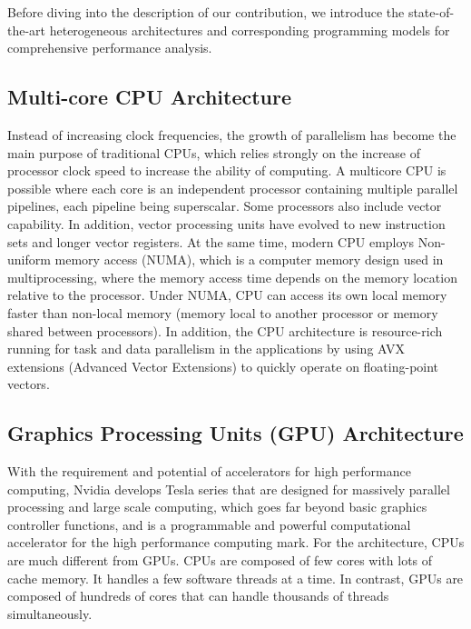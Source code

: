 
Before diving into the description of our contribution, we introduce the state-of-the-art heterogeneous architectures and corresponding programming models for comprehensive performance analysis.

\subsection{Multi-core CPU Architecture}
  Instead of increasing clock frequencies, the growth of parallelism has become the main purpose of traditional CPUs, which relies strongly on the increase of processor clock speed to increase the ability of computing. A multicore CPU is possible where each core is an independent processor containing multiple parallel pipelines, each pipeline being superscalar. Some processors also include vector capability. In addition, vector processing units have evolved to new instruction sets and longer vector registers. At the same time, modern CPU employs Non-uniform memory access (NUMA), which is a computer memory design used in multiprocessing, where the memory access time depends on the memory location relative to the processor. Under NUMA, CPU can access its own local memory faster than non-local memory (memory local to another processor or memory shared between processors). In addition, the CPU architecture is resource-rich running for task and data parallelism in the applications by using AVX extensions (Advanced Vector Extensions) to quickly operate on floating-point vectors.
  
\subsection{Graphics Processing Units (GPU) Architecture}
With the requirement and potential of accelerators for high performance computing, Nvidia develops Tesla series that are designed for massively parallel processing and large scale computing, which goes far beyond basic graphics controller functions, and is a programmable and powerful computational accelerator for the high performance computing mark. For the architecture, CPUs are much different from GPUs. CPUs are composed of few cores with lots of cache memory. It handles a few software threads at a time. In contrast, GPUs are composed of hundreds of cores that can handle thousands of threads simultaneously.
  
